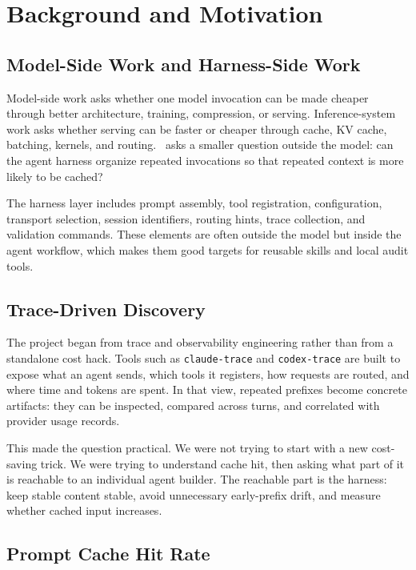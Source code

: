 \section{Background and Motivation}
\label{sec:background}

\subsection{Model-Side Work and Harness-Side Work}

Model-side work asks whether one model invocation can be made cheaper through better architecture, training, compression, or serving. Inference-system work asks whether serving can be faster or cheaper through cache, KV cache, batching, kernels, and routing. \toolname\ asks a smaller question outside the model: can the agent harness organize repeated invocations so that repeated context is more likely to be cached?

The harness layer includes prompt assembly, tool registration, configuration, transport selection, session identifiers, routing hints, trace collection, and validation commands. These elements are often outside the model but inside the agent workflow, which makes them good targets for reusable skills and local audit tools.

\subsection{Trace-Driven Discovery}

The project began from trace and observability engineering rather than from a standalone cost hack. Tools such as \texttt{claude-trace} and \texttt{codex-trace} are built to expose what an agent sends, which tools it registers, how requests are routed, and where time and tokens are spent. In that view, repeated prefixes become concrete artifacts: they can be inspected, compared across turns, and correlated with provider usage records.

This made the question practical. We were not trying to start with a new cost-saving trick. We were trying to understand cache hit, then asking what part of it is reachable to an individual agent builder. The reachable part is the harness: keep stable content stable, avoid unnecessary early-prefix drift, and measure whether cached input increases.

\subsection{Prompt Cache Hit Rate}

